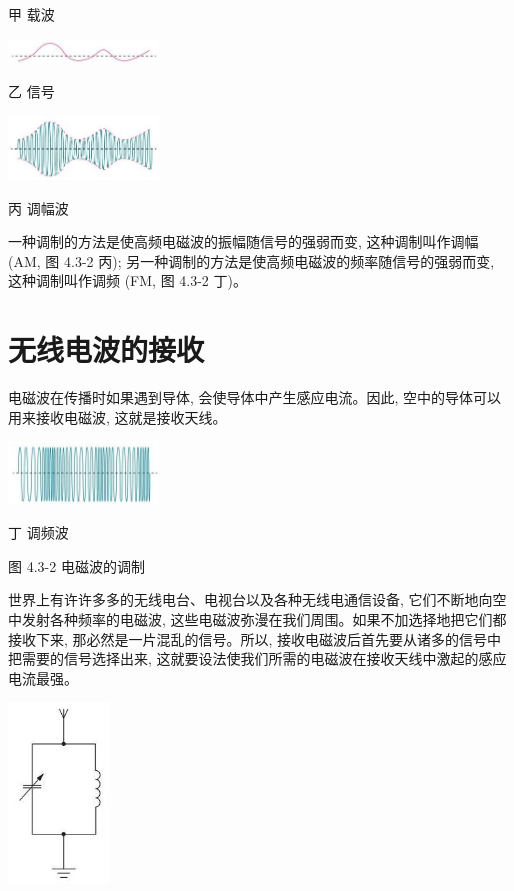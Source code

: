 \documentclass[10pt]{article}
\begin{document}
甲 载波

\begin{center}
\includegraphics[max width=0.3\textwidth]{images/01910e72-c5b7-7ed5-a6d4-fb3a5faefc32_86_239582.jpg}
\end{center}

乙 信号

\begin{center}
\includegraphics[max width=0.3\textwidth]{images/01910e72-c5b7-7ed5-a6d4-fb3a5faefc32_86_896662.jpg}
\end{center}

丙 调幅波

一种调制的方法是使高频电磁波的振幅随信号的强弱而变, 这种调制叫作调幅 (AM, 图 4.3-2 丙); 另一种调制的方法是使高频电磁波的频率随信号的强弱而变, 这种调制叫作调频 (FM, 图 4.3-2 丁)。

\section*{无线电波的接收}

电磁波在传播时如果遇到导体, 会使导体中产生感应电流。因此, 空中的导体可以用来接收电磁波, 这就是接收天线。

\begin{center}
\includegraphics[max width=0.3\textwidth]{images/01910e72-c5b7-7ed5-a6d4-fb3a5faefc32_86_160084.jpg}
\end{center}

丁 调频波

图 4.3-2 电磁波的调制

世界上有许许多多的无线电台、电视台以及各种无线电通信设备, 它们不断地向空中发射各种频率的电磁波, 这些电磁波弥漫在我们周围。如果不加选择地把它们都接收下来, 那必然是一片混乱的信号。所以, 接收电磁波后首先要从诸多的信号中把需要的信号选择出来, 这就要设法使我们所需的电磁波在接收天线中激起的感应电流最强。

\begin{center}
\includegraphics[max width=0.2\textwidth]{images/01910e72-c5b7-7ed5-a6d4-fb3a5faefc32_86_676458.jpg}
\end{center}
\end{document}

